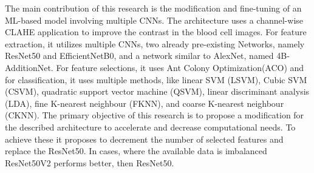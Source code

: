 The main contribution of this research is the modification and fine-tuning of an ML-based model involving multiple CNNs. The architecture uses a channel-wise CLAHE application to improve the contrast in the blood cell images. For feature extraction, it utilizes multiple CNNs, two already pre-existing Networks, namely ResNet50 and EfficientNetB0, and a network similar to AlexNet, named 4B-AdditionNet. For feature selections, it uses Ant Colony Optimization(ACO) and for classification, it uses multiple methods, like linear SVM (LSVM), Cubic SVM (CSVM), quadratic support vector machine (QSVM), linear discriminant analysis (LDA), fine K-nearest neighbour (FKNN), and coarse K-nearest neighbour (CKNN).
The primary objective of this research is to propose a modification for the described architecture to accelerate and decrease computational needs. To achieve these it proposes to decrement the number of selected features and replace the ResNet50. In cases, where the available data is imbalanced ResNet50V2 performs better, then ResNet50. %
 
